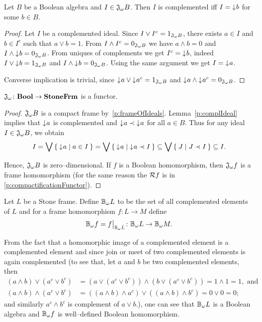 \begin{lemma}\label{p:complIdeal}
    Let $B$ be a Boolean algebra and $I \in \mathfrak{J}_{\omega} B$. Then $I$ is complemented iff $I = \mathord{\downarrow}\mkern1mu b$ for some $b \in B$.
\end{lemma}
\begin{proof}
    Let $I$ be a complemented ideal. Since $I \vee I^c = 1_{\mathfrak{J}_{\omega} B}$, there exists $a \in I$ and $b \in I^c$ such that $a \vee b = 1$. From $I \wedge I^c = 0_{\mathfrak{J}_{\omega} B}$ we have $a \wedge b = 0$ and $I \wedge \mathord{\downarrow}\mkern1mu b = 0_{\mathfrak{J}_{\omega} B}$.
    From uniques of complements we get $I^c = \mathord{\downarrow}\mkern1mu b$, indeed $I \vee \mathord{\downarrow}\mkern1mu b = 1_{\mathfrak{J}_{\omega} B}$ and $I \wedge \mathord{\downarrow}\mkern1mu b = 0_{\mathfrak{J}_{\omega} B}$. Using the same argument we get $I = \mathord{\downarrow}\mkern1mu a$.

    Converse implication is trivial, since $\mathord{\downarrow}\mkern1mu a \vee \mathord{\downarrow}\mkern1mu a^c = 1_{\mathfrak{J}_{\omega} B}$ and $\mathord{\downarrow}\mkern1mu a \wedge \mathord{\downarrow}\mkern1mu a^c = 0_{\mathfrak{J}_{\omega} B}$.
\end{proof}

\begin{proposition}\label{p:JisFunctor}
    $\mathfrak{J}_{\omega}\colon \mathbf{Bool} \to \mathbf{StoneFrm}$ is a functor.
\end{proposition}
\begin{proof}
    $\mathfrak{J}_{\omega} B$ is a compact frame by~\ref{p:frameOfIdeals}. Lemma~\ref{p:complIdeal} implies that $\mathord{\downarrow}\mkern1mu a$ is complemented and $\mathord{\downarrow}\mkern1mu a \prec \mathord{\downarrow}\mkern1mu a$ for all $a \in B$. Thus for any ideal $I \in \mathfrak{J}_{\omega} B$, we obtain
    $$ I = \bigvee \Set{ \mathord{\downarrow}\mkern1mua | a \in I } = \bigvee \Set{ \mathord{\downarrow}\mkern1mua | \mathord{\downarrow}\mkern1mua \prec I } \subseteq \bigvee \Set{ J | J \prec I } \subseteq I.$$

\noindent Hence, $\mathfrak{J}_{\omega} B$ is zero--dimensional. If $f$ is a Boolean homomorphism, then $\mathfrak{J}_{\omega} f$ is a frame homomorphism (for the same reason the $\mathcal{R} f$ is in \ref{p:compactificationFunctor}).
\end{proof}

\begin{definition}
    Let $L$ be a Stone frame. Define $\DEFSYM{BcO}{$\BcO{}$} L$ to be the set of all complemented elements of $L$ and for a frame homomorphism $f\colon L \to M$ define
    $$\BcO f = \restr{f}{\BcO L}\colon \BcO L \to \BcO M.$$
\end{definition}

From the fact that a homomorphic image of a complemented element is a complemented element and since join or meet of two complemented elements is again complemented (to see that, let $a$ and $b$ be two complemented elements, then
    \begin{align*}
        (a\wedge b) \vee (a^c \vee b^c)
            &= (a\vee (a^c\vee b^c))\wedge (b\vee (a^c\vee b^c))
            = 1 \wedge 1 = 1, \text{ and} \\
        (a\wedge b) \wedge (a^c \vee b^c)
            &= ((a\wedge b)\wedge a^c)\vee ((a\wedge b)\wedge b^c)
            = 0 \vee 0 = 0;
    \end{align*}
and similarly $a^c\wedge b^c$ is complement of $a\vee b$.), one can see that $\mathbb{B}_{\omega} L$ is a Boolean algebra and $\mathbb{B}_{\omega} f$ is well--defined Boolean homomorphism.


